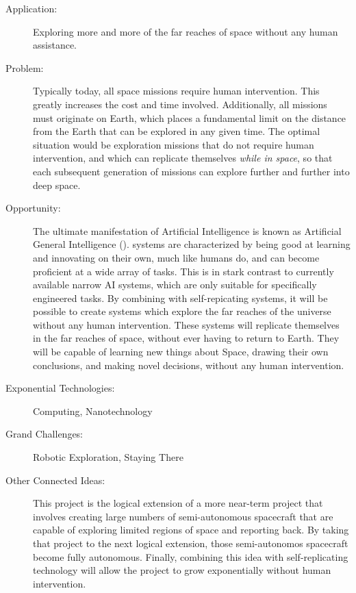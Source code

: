 \begin{description}
\item[Application:]

Exploring more and more of the far reaches of space without any human
assistance.


\item[Problem:]

Typically today, all space missions require human intervention. This
greatly increases the cost and time involved. Additionally, all missions
must originate on Earth, which places a fundamental limit on the distance
from the Earth that can be explored in any given time. The optimal
situation would be exploration missions that do not require human
intervention, and which can replicate themselves \emph{while in space},
so that each subsequent generation of missions can explore further
and further into deep space.


\item[Opportunity:]

The ultimate manifestation of Artificial Intelligence is known as
Artificial General Intelligence ().  systems are characterized
by being good at learning and innovating on their own, much like humans
do, and can become proficient at a wide array of tasks. This is in
stark contrast to currently available narrow AI systems, which are
only suitable for specifically engineered tasks. By combining 
with self-repicating systems, it will be possible to create systems
which explore the far reaches of the universe without any human intervention.
These systems will replicate themselves in the far reaches of space,
without ever having to return to Earth. They will be capable of learning
new things about Space, drawing their own conclusions, and making
novel decisions, without any human intervention.


\item[Exponential Technologies:]

Computing, Nanotechnology


\item[Grand Challenges:]

Robotic Exploration, Staying There


\item[Other Connected Ideas:]

This project is the logical extension of a more near-term project
that involves creating large numbers of semi-autonomous spacecraft
that are capable of exploring limited regions of space and reporting
back. By taking that project to the next logical extension, those
semi-autonomos spacecraft become fully autonomous. Finally, combining
this idea with self-replicating technology will allow the project
to grow exponentially without human intervention.



\end{description}
